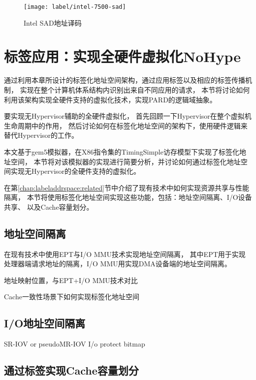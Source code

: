 \begin{figure}[tb]
  \centering
  \texttt{[image: label/intel-7500-sad]}
  \caption[Intel SAD地址译码]{Intel SAD地址译码}
  \label{fig:intel-7500-sad}
\end{figure}


\section{标签应用：实现全硬件虚拟化NoHype}
\label{chap:labeladdrspace:nohype}

通过利用本章所设计的标签化地址空间架构，通过应用标签以及相应的标签传播机制，
实现在整个计算机体系结构内识别出来自不同应用的请求，
本节将讨论如何利用该架构实现全硬件支持的虚拟化技术，实现PARD的逻辑域抽象。

要实现无Hypervisor辅助的全硬件虚拟化，
首先回顾一下Hypervisor在整个虚拟机生命周期中的作用，
然后讨论如何在标签化地址空间的架构下，使用硬件逻辑来替代Hypervisor的工作。


本文基于gem5\cite{binkert_gem5_2011}模拟器，在X86指令集的TimingSimple访存模型下实现了标签化地址空间，
本节将对该模拟器的实现进行简要分析，并讨论如何通过标签化地址空间实现无Hypervisor的全硬件支持的虚拟化。

在第\ref{chap:labeladdrspace:related}节中介绍了现有技术中如何实现资源共享与性能隔离，
本节将使用标签化地址空间实现这些功能，包括：地址空间隔离、I/O设备共享、
以及Cache容量划分。

\subsection{地址空间隔离}

在现有技术中使用EPT与I/O MMU技术实现地址空间隔离，
其中EPT用于实现处理器端请求地址的隔离，I/O MMU用实现DMA设备端的地址空间隔离。


地址映射位置，与EPT+I/O MMU技术对比

Cache一致性场景下如何实现标签化地址空间


\subsection{I/O地址空间隔离}

SR-IOV or pseudoMR-IOV
I/o protect bitmap

\subsection{通过标签实现Cache容量划分} %

